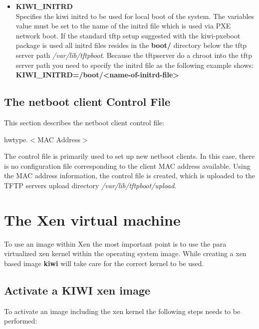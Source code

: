 \begin{itemize}
	\item \textbf{KIWI\_INITRD}\\
        Specifies the kiwi initrd to be used for local boot of the
        system. The variables value must be set to the name of the
        initrd file which is used via PXE network boot. If the
        standard tftp setup suggested with the kiwi-pxeboot package
        is used all initrd files resides in the \textbf{boot/} directory
        below the tftp server path \textit{/var/lib/tftpboot}. Because
        the tftpserver do a chroot into the tftp server path you need
        to specify the initrd file as the following example shows:
        \textbf{KIWI\_INITRD=/boot/<name-of-initrd-file>}
\end{itemize}


\subsection{The netboot client Control File}
\label{section:cntrlhw}
This section describes the netboot client control file:

\begin{Command}{8cm}
hwtype.$<$MAC Address$>$
\end{Command}

The control file is primarily used to set up new netboot clients. In this
case, there is no configuration file corresponding to the client
MAC address available. Using the MAC address information, the control file
is created, which is uploaded to the TFTP servers upload directory
\textit{/var/lib/tftpboot/upload}.

\section{The Xen virtual machine}
To use an image within Xen the most important point is to use
the para virtualized xen kernel within the operating system image.
While creating a xen based image \textbf{kiwi} will take care
for the correct kernel to be used.

\subsection{Activate a KIWI xen image}
To activate an image including the xen kernel the following steps
needs to be performed:

